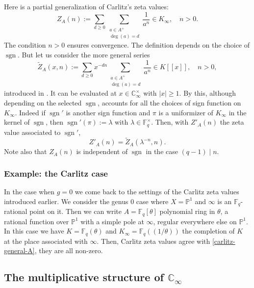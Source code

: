 \documentclass[11pt]{amsart}
\numberwithin{equation}{section}
\newcommand{\FF}{\mathbb{F}}
\newcommand{\CC}{\mathbb{C}}
\newcommand{\PP}{\mathbb{P}}
\newcommand{\sgn}{\operatorname{sgn}}
\begin{document}
Here is a partial generalization of Carlitz's zeta values:
\begin{equation}\label{carlitz-general-A}
Z_A(n):=\sum_{d\geq0}\sum_{\begin{smallmatrix}a\in A^+\\ \deg(a)=d\end{smallmatrix}}\frac{1}{a^n}\in K_\infty,\quad n>0.
\end{equation}
The condition $n>0$ ensures convergence. The definition depends on the choice of $\sgn$. But let us consider the more general series
$$\widetilde{Z}_A(x,n):=\sum_{d\geq0}x^{-dn}\sum_{\begin{smallmatrix}a\in A^+\\ \deg(a)=d\end{smallmatrix}}\frac{1}{a^n}\in K[[x]],\quad n>0,$$ introduced in \cite[\S 2]{THA}. It can be evaluated at $x\in\CC_\infty^\times$ with $|x|\geq 1$.
By \cite[Proposition 7.2.3]{GOS} this, although depending on the selected $\sgn$, accounts for all the choices of sign function on $K_\infty$.
Indeed if $\sgn'$ is another sign function and $\pi$ is a uniformizer of $K_\infty$ in the kernel of $\sgn$, then $\sgn'(\pi):=\lambda$ with $\lambda\in\FF_q^\times$. Then, with $Z'_A(n)$ the zeta value associated to $\sgn'$,
$$Z'_A(n)=\widetilde{Z}_A(\lambda^{-n},n).$$
Note also that $Z_A(n)$ is independent of $\sgn$ in the case $(q-1)\mid n$.

\subsubsection{Example: the Carlitz case}\label{in-genus-0}

In the case when $g=0$ we come back to the settings of the Carlitz zeta values introduced earlier.
We consider the genus $0$ case where $X=\mathbb P^1$ and $\infty$ is an $\FF_q$-rational point on it. Then we can write $A=\FF_q[\theta]$  polynomial ring in $\theta$, a rational function over $\PP^1$ with a simple pole at $\infty$, regular everywhere else on $\PP^1$. In this case we have $K=\FF_q(\theta)$ and $K_\infty=\FF_q((1/\theta))$ the completion of $K$ at the place associated with $\infty$. Then, Carlitz zeta values agree with \eqref{carlitz-general-A}, they are all non-zero.

\subsection{The multiplicative structure of $\CC_\infty$}
\end{document}
